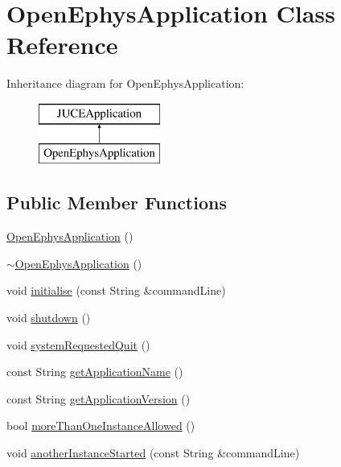 \hypertarget{class_open_ephys_application}{}\section{Open\+Ephys\+Application Class Reference}
\label{class_open_ephys_application}
Inheritance diagram for Open\+Ephys\+Application\+:\begin{figure}[H]
\begin{center}
\leavevmode
\includegraphics[height=2.000000cm]{class_open_ephys_application}
\end{center}
\end{figure}
\subsection*{Public Member Functions}
\begin{DoxyCompactItemize}
\item 
\mbox{\hyperlink{class_open_ephys_application_a94f33012624a8ec6f5fa3d518027f6fd}{Open\+Ephys\+Application}} ()
\item 
\mbox{\hyperlink{class_open_ephys_application_ac6e352344cd7784bf663b4cc89df69a5}{$\sim$\+Open\+Ephys\+Application}} ()
\item 
void \mbox{\hyperlink{class_open_ephys_application_ab6478b49a9cd18953be1c92b7afd94dc}{initialise}} (const String \&command\+Line)
\item 
void \mbox{\hyperlink{class_open_ephys_application_afc4d64c2d4b6396677a84d5996889e8c}{shutdown}} ()
\item 
void \mbox{\hyperlink{class_open_ephys_application_ab5b3ad9b64ab7d1e4022b967affe3d36}{system\+Requested\+Quit}} ()
\item 
const String \mbox{\hyperlink{class_open_ephys_application_a1ce6b2a2087529f2e26c7031158bfba5}{get\+Application\+Name}} ()
\item 
const String \mbox{\hyperlink{class_open_ephys_application_a44ecd24664080c3d132caaf01cdd6aed}{get\+Application\+Version}} ()
\item 
bool \mbox{\hyperlink{class_open_ephys_application_a6aa18333972da12661f9ee2ea39ed0c5}{more\+Than\+One\+Instance\+Allowed}} ()
\item 
void \mbox{\hyperlink{class_open_ephys_application_af96bfb4d3cb1bf734c75952032de3b70}{another\+Instance\+Started}} (const String \&command\+Line)
\end{DoxyCompactItemize}


